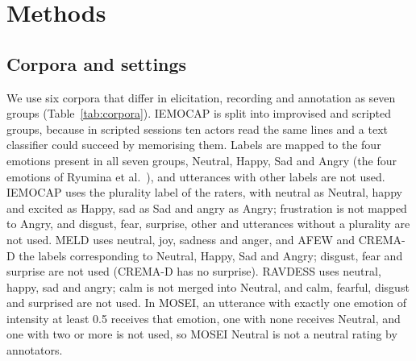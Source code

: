 \FloatBarrier
\section{Methods}\label{sec:methods}

\subsection{Corpora and settings}\label{sec:setup}
We use six corpora that differ in elicitation, recording and annotation as seven groups (Table~\ref{tab:corpora}). IEMOCAP \cite{busso2008iemocap} is split into improvised and scripted groups, because in scripted sessions ten actors read the same lines and a text classifier could succeed by memorising them. Labels are mapped to the four emotions present in all seven groups, Neutral, Happy, Sad and Angry (the four emotions of Ryumina et al.\ \cite{ryumina2025}), and utterances with other labels are not used. IEMOCAP uses the plurality label of the raters, with neutral as Neutral, happy and excited as Happy, sad as Sad and angry as Angry; frustration is not mapped to Angry, and disgust, fear, surprise, other and utterances without a plurality are not used. MELD uses neutral, joy, sadness and anger, and AFEW and CREMA-D the labels corresponding to Neutral, Happy, Sad and Angry; disgust, fear and surprise are not used (CREMA-D has no surprise). RAVDESS uses neutral, happy, sad and angry; calm is not merged into Neutral, and calm, fearful, disgust and surprised are not used. In MOSEI, an utterance with exactly one emotion of intensity at least 0.5 receives that emotion, one with none receives Neutral, and one with two or more is not used, so MOSEI Neutral is not a neutral rating by annotators.

